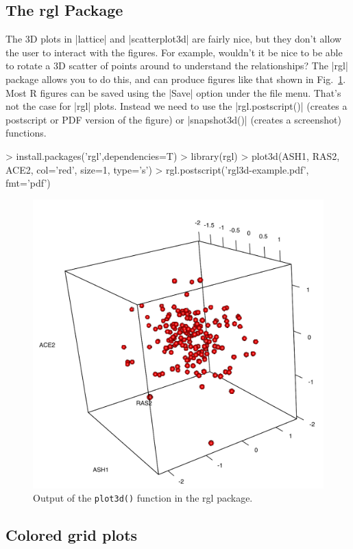 \subsection{The rgl Package}

The 3D plots in |lattice| and |scatterplot3d| are fairly nice, but they don't allow the user to interact with the figures.  For example, wouldn't it be nice to be able to rotate a 3D scatter of points around to understand the relationships?  The |rgl| package allows you to do this, and can produce figures like that shown in Fig.~\ref{fig:rgl3d}.  Most R figures can be saved  using the |Save| option under the file menu. That's not the case for |rgl| plots. Instead we need to use the |rgl.postscript()| (creates a postscript or PDF version of the figure) or |snapshot3d()| (creates a screenshot) functions.
\begin{R}
> install.packages('rgl',dependencies=T)
> library(rgl)
> plot3d(ASH1, RAS2, ACE2, col='red', size=1, type='s')
> rgl.postscript('rgl3d-example.pdf', fmt='pdf')
\end{R}
%
\begin{figure}[htbp]
\centering
\includegraphics[width=0.5\columnwidth]{./figures/hands-on3/rgl3d-example.pdf}
\caption{Output of the \lstinline!plot3d()! function in the rgl package.\label{fig:rgl3d}}
\end{figure}



\subsection{Colored grid plots}

